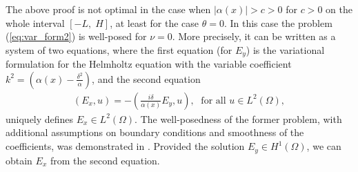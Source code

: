 \begin{remark} 
\label{remark:other}
The above proof is not optimal in the case when $\left|\alpha(x)\right|>c>0$ for $c>0$ on the whole interval $[-L,\; H]$, at least 
for the case $\theta=0$. In this case the problem (\ref{eq:var_form2}) is well-posed for $\nu=0$. More precisely, it can be written 
as a system of two equations, where the first equation (for $E_y$) is the variational formulation for the Helmholtz equation 
with the variable coefficient $k^2=(\alpha(x)-\frac{\delta^2}{\alpha})$, and the second equation 
\begin{align*}
  \left(E_x,u\right)=-\left(\frac{i\delta}{\alpha(x)}E_y,u\right),\; \text{ for all } u\in L^{2}(\Omega), 
\end{align*}
uniquely defines $E_x\in L^{2}(\Omega)$. The well-posedness of the former problem, with additional assumptions on boundary conditions and smoothness of the coefficients, 
was demonstrated in \cite{LMIG_thesis}. Provided the solution $E_y\in H^{1}(\Omega)$, we can obtain $E_x$ from the second equation.



\end{remark}
